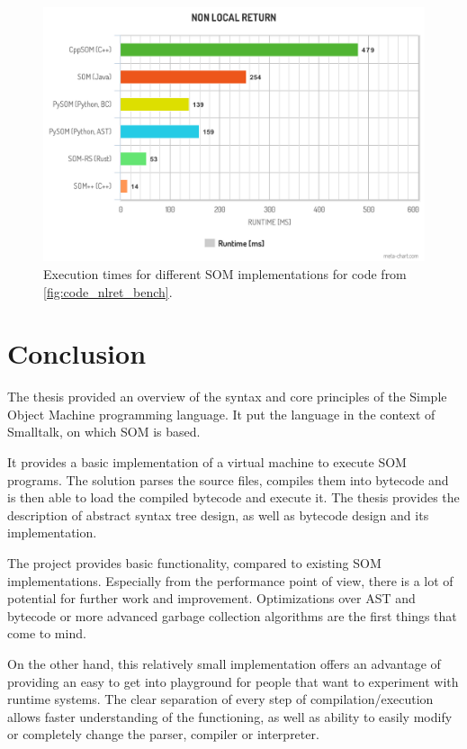 \documentclass[thesis=M,english]{FITthesis}[2019/12/23]
\begin{document}
\begin{figure}
	\centering
	\includegraphics[width=\textwidth]{media/nlret_chart_1.png}
	\caption{Execution times for different SOM implementations for code from \ref{fig:code_nlret_bench}.}
	\label{fig:nlret_chart}
\end{figure}

\chapter{Conclusion}
The thesis provided an overview of the syntax and core principles of the Simple Object Machine programming language. It put
the language in the context of Smalltalk, on which SOM is based.

It provides a basic implementation of a virtual machine to execute SOM programs. The solution parses the source files, compiles them into
bytecode and is then able to load the compiled bytecode and execute it. The thesis provides the description of abstract syntax tree design,
as well as bytecode design and its implementation. 

The project provides basic functionality, compared to existing SOM implementations. Especially from the performance point of view,
there is a lot of potential for further work and improvement. Optimizations over AST and bytecode or more advanced garbage collection
algorithms are the first things that come to mind.

On the other hand, this relatively small implementation offers an advantage of providing an easy to get into playground for people that
want to experiment with runtime systems. The clear separation of every step of compilation/execution allows faster understanding of the
functioning, as well as ability to easily modify or completely change the parser, compiler or interpreter.
\end{document}
